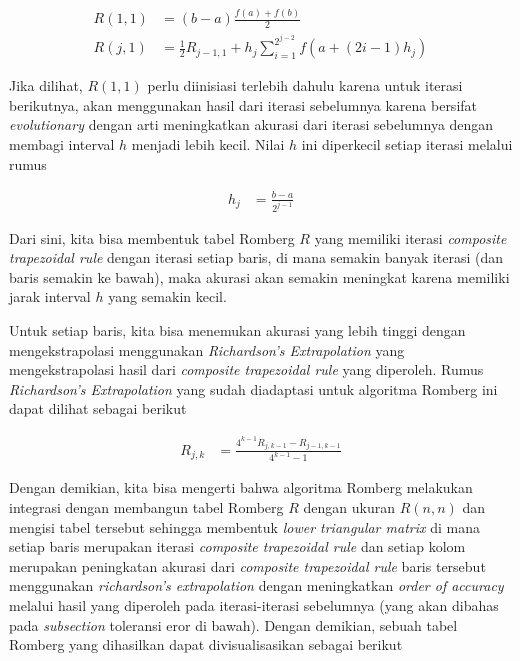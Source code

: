 \documentclass[journal,12pt,onecolumn,a4paper]{IEEEtran}
\begin{document}
\begin{equation*}
	\begin{split}
		R(1,1) & = (b-a)\frac{f(a)+f(b)}{2} \\
		R(j,1) & = \frac{1}{2}R_{j-1,1}+h_j\sum_{i=1}^{2^{j-2}}f(a+(2i-1)h_j)
	\end{split}
\end{equation*}

Jika dilihat, \(R(1,1)\) perlu diinisiasi terlebih dahulu karena untuk iterasi berikutnya, akan menggunakan hasil dari iterasi sebelumnya karena bersifat \emph{evolutionary} dengan arti meningkatkan akurasi dari iterasi sebelumnya dengan membagi interval \(h\) menjadi lebih kecil. Nilai \(h\) ini diperkecil setiap iterasi melalui rumus

\begin{equation*}
	\begin{split}
		h_j & = \frac{b-a}{2^{j-1}}
	\end{split}
\end{equation*}

Dari sini, kita bisa membentuk tabel Romberg \(R\) yang memiliki iterasi \emph{composite trapezoidal rule} dengan iterasi setiap baris, di mana semakin banyak iterasi (dan baris semakin ke bawah), maka akurasi akan semakin meningkat karena memiliki jarak interval \(h\) yang semakin kecil.

Untuk setiap baris, kita bisa menemukan akurasi yang lebih tinggi dengan mengekstrapolasi menggunakan \emph{Richardson's Extrapolation} yang mengekstrapolasi hasil dari \emph{composite trapezoidal rule} yang diperoleh. Rumus \emph{Richardson's Extrapolation} yang sudah diadaptasi untuk algoritma Romberg ini dapat dilihat sebagai berikut

\begin{equation*}
	\begin{split}
		R_{j,k} & = \frac{4^{k-1}R_{j,k-1}-R_{j-1,k-1}}{4^{k-1}-1}
	\end{split}
\end{equation*}

Dengan demikian, kita bisa mengerti bahwa algoritma Romberg melakukan integrasi dengan membangun tabel Romberg \(R\) dengan ukuran \(R(n,n)\) dan mengisi tabel tersebut sehingga membentuk \emph{lower triangular matrix} di mana setiap baris merupakan iterasi \emph{composite trapezoidal rule} dan setiap kolom merupakan peningkatan akurasi dari \emph{composite trapezoidal rule} baris tersebut menggunakan \emph{richardson's extrapolation} dengan meningkatkan \emph{order of accuracy} melalui hasil yang diperoleh pada iterasi-iterasi sebelumnya (yang akan dibahas pada \emph{subsection} toleransi eror di bawah). Dengan demikian, sebuah tabel Romberg yang dihasilkan dapat divisualisasikan sebagai berikut
\end{document}
